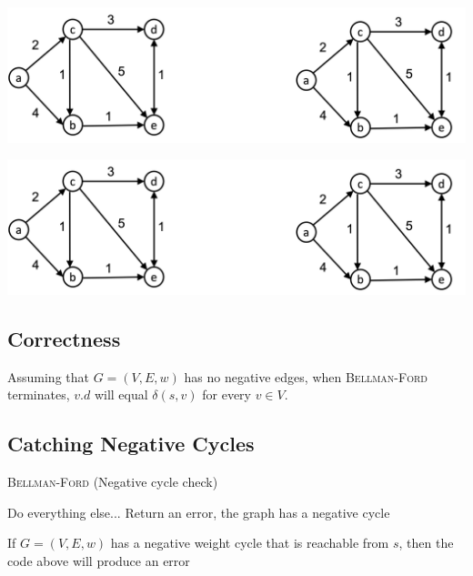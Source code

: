 \documentclass[11  pt]{exam}
\begin{document}
	\includegraphics[width = \linewidth]{twographs.png}
	
	\includegraphics[width = \linewidth]{twographs.png}
	
	\newpage
	
	\subsection{Correctness}
	\begin{theorem}
		Assuming that $G = (V,E,w)$ has no negative edges, when \textsc{Bellman-Ford} terminates, $v.d$ will equal $\delta(s,v)$ for every $v \in V$. 
	\end{theorem}
	
	
	\newpage
	
	
	\subsection{Catching Negative Cycles}
	\begin{algorithm}
		\textsc{Bellman-Ford} (Negative cycle check)
		\begin{algorithmic}
			\State Do everything else...
			\State Return an error, the graph has a negative cycle
			\EndIf
			\EndFor
		\end{algorithmic}
	\end{algorithm}
	
	\begin{theorem}
		If $G = (V,E,w)$ has a negative weight cycle that is reachable from $s$, then the code above will produce an error
	\end{theorem}
	
	\newpage
	
\end{document}
